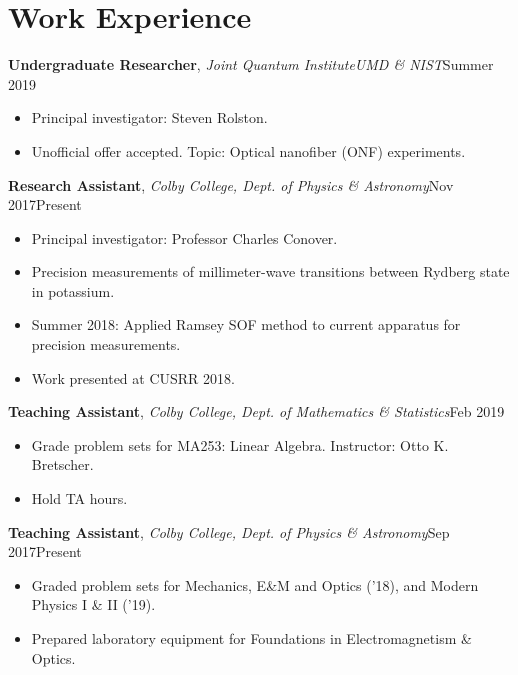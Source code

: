 \documentclass[a4paper, 10.5pt]{article}
\begin{document}
	\section*{\normalsize{{\color{colby}\textbf{Work Experience}}}}
	\textbf{Undergraduate Researcher},  \textit{Joint Quantum Institute\textemdash UMD \&  NIST}\hfill Summer 2019
	\begin{itemize}[noitemsep, nolistsep]
		\setlength{\itemindent}{0.2in}
		\item Principal investigator: Steven Rolston.
		\item Unofficial offer accepted. Topic: Optical nanofiber (ONF) experiments. \\
	\end{itemize}
	\indent \indent \textbf{Research Assistant}, \textit{Colby College, Dept. of Physics \& Astronomy}\hfill Nov 2017\textemdash Present
	\begin{itemize}[noitemsep, nolistsep]
		\setlength{\itemindent}{0.2in}
		\item Principal investigator: Professor Charles Conover.
		\item Precision measurements of millimeter-wave transitions between Rydberg state in potassium.
		\item Summer 2018: Applied Ramsey SOF method to current apparatus for precision measurements.
		\item Work presented at CUSRR 2018.\\
	\end{itemize}	
	\indent \indent \textbf{Teaching Assistant}, \textit{Colby College, Dept. of Mathematics \& Statistics}\hfill Feb 2019 
	\begin{itemize}[noitemsep, nolistsep]
		\setlength{\itemindent}{0.2in}
		\item Grade problem sets for MA253: Linear Algebra. Instructor: Otto K. Bretscher.
		\item Hold TA hours.\\
	\end{itemize}
	\indent \indent \textbf{Teaching Assistant}, \textit{Colby College, Dept. of Physics \& Astronomy}\hfill Sep 2017\textemdash Present
	\begin{itemize}[noitemsep, nolistsep]
		\setlength{\itemindent}{0.2in}
		\item Graded problem sets for Mechanics, E\&M and Optics ('18), and Modern Physics I \& II ('19).
		\item Prepared laboratory equipment for Foundations in Electromagnetism \& Optics.\\
	\end{itemize}
\end{document}
